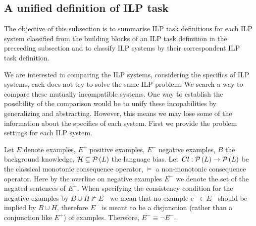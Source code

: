 \subsection{A unified definition of ILP task}
The objective of this subsection is to summarise ILP task definitions for each ILP system classified from the building blocks of an ILP task definition in the preceeding subsection  and to classify ILP systems by their correspondent ILP task definition.

We are interested in comparing the ILP systems, considering the specifics of ILP systems, each does not try to solve the same ILP problem. We search a way to compare these mutually incompatible systems. One way to establish the possibility of the comparison would be to unify these incopabilities by generalizing and abstracting. However, this means we may lose some of the information about the specifics of each system. First we provide the problem settings for each ILP system.

Let $E$ denote examples, $E^{+}$ positive examples, $E^{-}$ negative examples, $B$ the background knowledge, $\mathcal{H} \subseteq \mathcal{P} \left({ L }\right)$ the language bias. Let $Cl:\mathcal{P} \left({ L }\right) \to \mathcal{P} \left({ L }\right)$ be the classical monotonic consequence operator, $\models$ a non-monotonic consequence operator. Here by the overline on negative examples $\overline{E^{-}}$ we denote the set of the negated sentences of $E^{-}$. When specifying the consistency condition for the negative examples by $B \cup H \not\models E^{-}$ we mean that no example $e^{-} \in E^{-}$ should be implied by $B \cup H$, therefore $E^{-}$ is meant to be a disjunction (rather than a conjunction like $E^{+}$) of examples. Therefore, $\overline{E^{-}} \equiv \neg E^{-}$.

